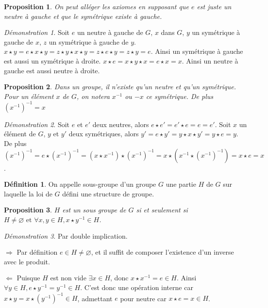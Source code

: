 \documentclass[a4paper, 11pt, french]{book}
\newenvironment{itemise}{\itemize}{\enditemize}
\theoremstyle{plain} %
\newtheorem{proposition}{Proposition}
\theoremstyle{definition} %
\newtheorem{definition}{Définition}
\theoremstyle{remark} %
\newtheorem*{demonstration}{Démonstration}
\newcommand{\1}{\mathds{1}}
\newcommand\vide{\varnothing}
\newcommand{\inv}[1]{#1^{-1}}
\newcommand\et{\text{ et }}
\begin{document}
\begin{proposition}
	On peut alléger les axiomes en supposant que $e$ est juste un neutre à gauche et que le symétrique existe à gauche.
\end{proposition}

\begin{demonstration}
	Soit $e$ un neutre à gauche de $G$, $x$ dans $G$, $y$ un symétrique à gauche de $x$, $z$ un symétrique à gauche de $y$.
	$x\star y=e\star x\star y=z\star y\star x\star y=z\star e\star y=z\star y=e$.
	Ainsi un symétrique à gauche est aussi un symétrique à droite.
	$x\star e=x\star y\star x=e\star x=x$.
	Ainsi un neutre à gauche est aussi neutre à droite.
\end{demonstration}

\begin{proposition}
	Dans un groupe, il n'existe qu'un neutre et qu'un symétrique.
	Pour un élément $x$ de $G$, on notera $ x^{-1}$ ou $-x$ ce symétrique.
	De plus $\inv{(x^{-1})}=x$
\end{proposition}

\begin{demonstration}
	Soit $e$ et $e'$ deux neutres, alors $e\star e'=e'\star e=e=e'$.
	Soit $x$ un élément de $G$, $y$ et $y'$ deux symétriques, alors $y'=e\star y'=y\star x\star y'=y\star e=y$.
	De plus $(x^{-1})^{-1}=e\star(x^{-1})^{-1}=(x\star x^{-1})\star(x^{-1})^{-1}=x\star(x^{-1}\star(x^{-1})^{-1})=x\star e=x$.
\end{demonstration}

\begin{definition}
	On appelle sous-groupe d'un groupe $G$ une partie $H$ de $G$ sur laquelle la loi de $G$ défini une structure de groupe.
\end{definition}

\begin{proposition}
	$H$ est un sous groupe de $G$ si et seulement si $H\neq\vide\et\forall x, y\in H, x\star\inv{y}\in H$.
\end{proposition}

\begin{demonstration}
	Par double implication.
	\begin{itemise}
		\item[$\Rightarrow$] Par définition $e\in H\neq\vide$, et il suffit de composer l'existence d'un inverse avec le produit.
		\item[$\Leftarrow$] Puisque $H$ est non vide $\exists x\in H$, donc $x\star x^{-1}=e\in H$.
		Ainsi $\forall y\in H, e\star\inv{y}=\inv{y}\in H$.
		C'est donc une opération interne car $x\star y=x\star\inv{(\inv{y})}\in H$, admettant $e$ pour neutre car $x\star e=x\in H$.
	\end{itemise}
\end{demonstration}
\end{document}

